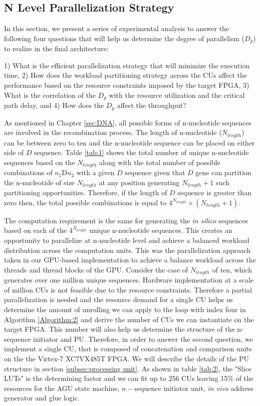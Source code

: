 \subsection{N Level Parallelization Strategy}\label{subsec:Parallel}

In this section, we present a series of experimental analysis to answer the following four questions that will help us determine the degree of parallelism ($D_{p}$) to realize in the final architecture:

1) What is the efficient parallelization strategy that will minimize the execution time, 
2) How does the workload partitioning strategy across the CUs affect the performance based on the resource constraints imposed by the target FPGA,
3) What is the correlation of the $D_p$ with the resource utilization and the critical path delay, and
4) How does the $D_p$ affect the throughput?

As mentioned in Chapter \ref{sec:DNA}, all possible forms of n-nucleotide sequences are involved in the recombination process. The length of n-nucleotide ($N_{length}$) can be between zero to ten and the n-nucleotide sequence can be placed on either side of $D$ sequence. Table \ref{tab:1} shows the total number of unique n-nucleotide sequences based on the $N_{length}$ along with the total number of possible combinations of $n_{1}$D$n_{2}$ with a given $D$ sequence given that $D$ gene can partition the n-nucleotide of  size $N_{length}$ at any position generating $N_{length}+1$ such partitioning opportunities. Therefore, if the length of $D$ sequence is greater than zero then, the total possible combinations is equal to $4^{ N_{length}} \times (N_{length}+1)$.

The computation requirement is the same for generating  the \emph{in silico} sequences based on each of the $4^{ N_{length}}$ unique n-nucleotide sequences. This creates an opportunity to parallelize at n-nucleotide level and achieve a balanced workload distribution across the computation units. This was the parallelization approach taken in our GPU-based implementation to achieve a balance workload across the threads and thread blocks of the GPU.  
Consider the case of $N_{length}$ of ten, which generates over one million unique sequences. Hardware implementation at a scale of million CUs is not feasible due to  the resource constraints. Therefore a partial parallelization is needed and the resource demand for a single CU helps us determine the amount of unrolling we can apply to the loop with index four in Algorithm \ref{Algorithm:2} and derive the number of CUs we can instantiate on the target FPGA. This number will also help us determine the structure of the n-sequence initiator and PU. Therefore, in order to answer the second question, we implement a single CU, that is composed of concatenation and comparison units on the the Virtex-7 XC7VX485T FPGA. We will describe the details of the PU structure in section \ref{subsec:processing unit}. As shown in table \ref{tab:2}, the "Slice LUTs" is the determining factor and we can fit up to 256 CUs leaving 15\% of the resources for the AGU state machine, $n-$sequence initiator unit, \emph{in vivo} address generator and glue logic. 

